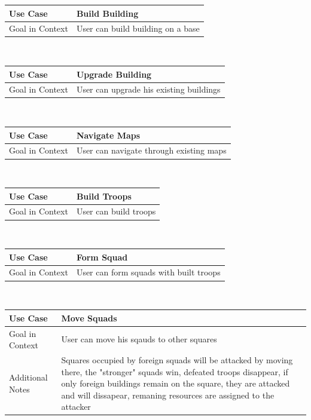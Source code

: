 \documentclass[a4paper]{article}
\begin{document}
\begin{tabular}[t]{|l|l|l|}
\hline
\textbf{Use Case}	&	\multicolumn{2}{|l|}{\textbf{Build Building}}\\
\hline
Goal in Context	&	\multicolumn{2}{|l|}{User can build building on a base}\\
\hline
\end{tabular}\\

\begin{tabular}[t]{|l|l|l|}
\hline
\textbf{Use Case}	&	\multicolumn{2}{|l|}{\textbf{Upgrade Building}}\\
\hline
Goal in Context	&	\multicolumn{2}{|l|}{User can upgrade his existing buildings}\\
\hline
\end{tabular}\\

\begin{tabular}[t]{|l|l|l|}
\hline
\textbf{Use Case}	&	\multicolumn{2}{|l|}{\textbf{Navigate Maps}}\\
\hline
Goal in Context	&	\multicolumn{2}{|l|}{User can navigate through existing maps}\\
\hline
\end{tabular}\\

\begin{tabular}[t]{|l|l|l|}
\hline
\textbf{Use Case}	&	\multicolumn{2}{|l|}{\textbf{Build Troops}}\\
\hline
Goal in Context	&	\multicolumn{2}{|l|}{User can build troops}\\
\hline
\end{tabular}\\

\begin{tabular}[t]{|l|l|l|}
\hline
\textbf{Use Case}	&	\multicolumn{2}{|l|}{\textbf{Form Squad}}\\
\hline
Goal in Context	&	\multicolumn{2}{|l|}{User can form squads with built troops}\\
\hline
\end{tabular}\\

\begin{tabular}[t]{|l|l|l|}
\hline
\textbf{Use Case}	&	\multicolumn{2}{|l|}{\textbf{Move Squads}}\\
\hline
Goal in Context	&	\multicolumn{2}{|l|}{User can move his sqauds to other squares}\\
\hline
Additional Notes	&	\multicolumn{2}{|p{10cm}|}{Squares occupied by foreign squads will be attacked by moving there, the "stronger" squads win, defeated troops disappear, if only foreign buildings remain on the square, they are attacked and will dissapear, remaning resources are assigned to the attacker}\\
\hline
\end{tabular}\\
\end{document}
